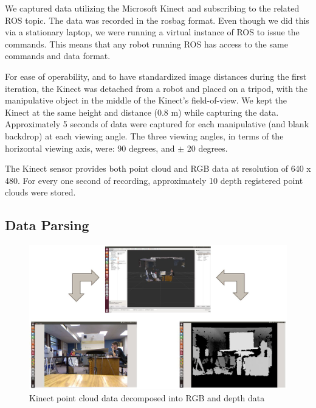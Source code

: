 \documentclass{article}
\begin{document}
We captured data utilizing the Microsoft Kinect and subscribing to the related ROS topic.  The data was recorded in the rosbag format.  Even though we did this via a stationary laptop, we were running a virtual instance of ROS to issue the commands. This means that any robot running ROS has access to the same commands and data format. 

For ease of operability, and to have standardized image distances during the first iteration, the Kinect  was detached from a robot and placed on a tripod, with the manipulative object in the middle of the Kinect's field-of-view. We kept the Kinect at the same height and distance (0.8 m) while capturing the data. Approximately 5 seconds of data were captured for each manipulative (and blank backdrop) at each viewing angle. The three viewing angles, in terms of the horizontal viewing axis, were: 90 degrees, and \(\pm\) 20 degrees.

The Kinect sensor provides both point cloud and RGB data at resolution of 640 x 480. For every one second of recording, approximately 10 depth registered point clouds were stored.

\subsection{Data Parsing}

\begin{figure}
	\centering
	\includegraphics[width=1.0\textwidth]{RVIZ_Decomposition.JPG}
	\caption{Kinect point cloud data decomposed into RGB and depth data}
	\label{fig:RVIZ_decomp}
\end{figure}
\end{document}
